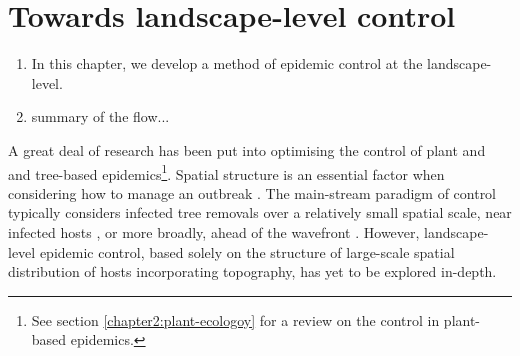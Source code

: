 
\chapter{Towards landscape-level control}


\begin{enumerate}
    \item In this chapter, we develop a method of epidemic control at the landscape-level.
    \item summary of the flow...
\end{enumerate}

\label{ch7:landscape-level-control}
A great deal of research has been put into optimising the control of plant and and tree-based epidemics\footnote{See section \ref{chapter2:plant-ecologoy} for a review on the control in plant-based epidemics.}. 
Spatial structure is an essential factor when considering how to manage an outbreak \cite{spatial-control-optimisation, control-heterogeneous-landscapes}. 
The main-stream paradigm of control typically considers infected tree removals over a relatively small spatial scale, near infected hosts \cite{WEBIDEMICS}, or more broadly, ahead of the wavefront \cite{large-scale-control}. 
However, landscape-level epidemic control, based solely on the structure of large-scale spatial distribution of hosts incorporating topography, has yet to be explored in-depth.

